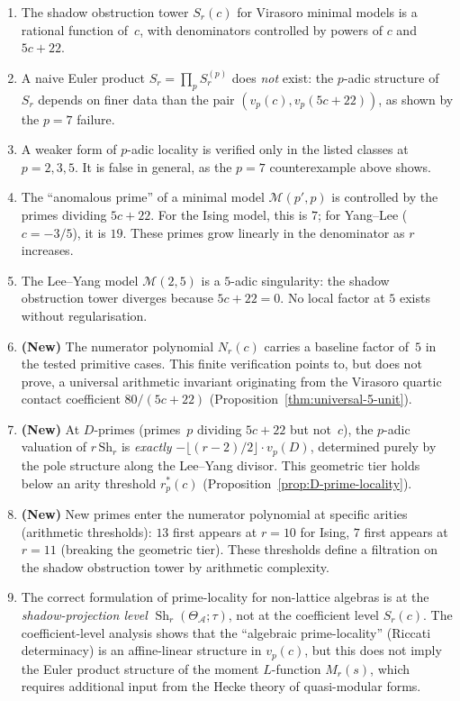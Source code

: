 \documentclass[11pt]{article}
\newcommand{\cA}{\mathcal{A}}
\newcommand{\cM}{\mathcal{M}}
\begin{document}
\begin{enumerate}[label=\textup{(\arabic*)}]
\item The shadow obstruction tower $S_r(c)$ for Virasoro minimal models is
  a rational function of~$c$, with denominators controlled by
  powers of $c$ and $5c+22$.

\item A naive Euler product $S_r = \prod_p S_r^{(p)}$ does
  \emph{not} exist: the $p$-adic structure of $S_r$ depends on
  finer data than the pair $(v_p(c), v_p(5c+22))$, as shown by
  the $p = 7$ failure.

\item A weaker form of $p$-adic locality is verified only in the
  listed classes at $p = 2, 3, 5$.  It is false in general, as
  the $p=7$ counterexample above shows.

\item The ``anomalous prime'' of a minimal model $\cM(p', p)$ is
  controlled by the primes dividing $5c+22$.  For the Ising
  model, this is $7$; for Yang--Lee ($c = -3/5$), it is $19$.
  These primes grow linearly in the denominator as $r$ increases.

\item The Lee--Yang model $\cM(2,5)$ is a $5$-adic singularity:
  the shadow obstruction tower diverges because $5c+22 = 0$.  No local
  factor at $5$ exists without regularisation.

\item \textbf{(New)} The numerator polynomial $N_r(c)$ carries
  a baseline factor of~$5$ in the tested primitive cases.  This
  finite verification points to, but does not prove, a universal
  arithmetic invariant originating from the Virasoro quartic
  contact coefficient $80/(5c{+}22)$
  (Proposition~\ref{thm:universal-5-unit}).

\item \textbf{(New)} At $D$-primes (primes~$p$ dividing
  $5c + 22$ but not~$c$), the $p$-adic valuation of
  $r\,\mathrm{Sh}_r$ is \emph{exactly}
  $-\lfloor(r{-}2)/2\rfloor \cdot v_p(D)$, determined purely
  by the pole structure along the Lee--Yang divisor.  This
  geometric tier holds below an arity threshold $r_p^*(c)$
  (Proposition~\ref{prop:D-prime-locality}).

\item \textbf{(New)} New primes enter the numerator polynomial
  at specific arities (arithmetic thresholds): $13$ first
  appears at $r = 10$ for Ising, $7$ first appears at $r = 11$
  (breaking the geometric tier).  These thresholds define a
  filtration on the shadow obstruction tower by arithmetic complexity.

\item The correct formulation of prime-locality for non-lattice
  algebras is at the \emph{shadow-projection level}
  $\operatorname{Sh}_r(\Theta_\cA; \tau)$, not at the
  coefficient level $S_r(c)$.  The coefficient-level analysis
  shows that the ``algebraic prime-locality'' (Riccati
  determinacy) is an affine-linear structure in $v_p(c)$, but
  this does not imply the Euler product structure of the moment
  $L$-function $M_r(s)$, which requires additional input from
  the Hecke theory of quasi-modular forms.
\end{enumerate}
\end{document}
